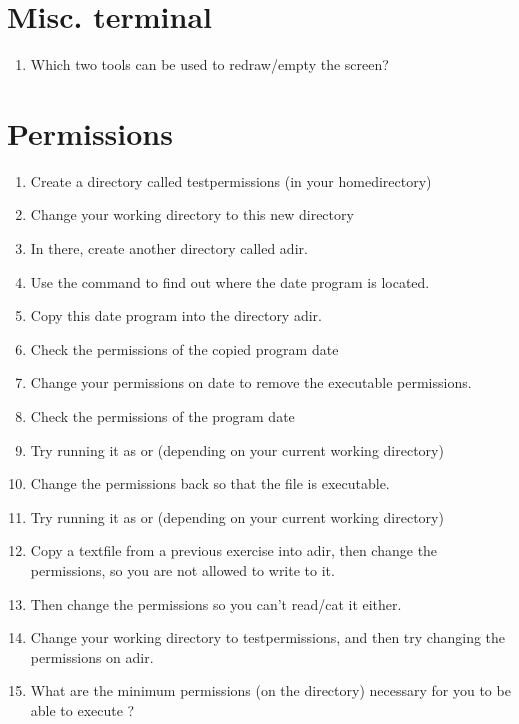 \documentclass[a4paper,11pt,english]{sphinxmanual}
\begin{document}
\section{Misc. terminal}
\label{exercises/exercises_beginner:misc-terminal}\begin{enumerate}
\item {} 
Which two tools can be used to redraw/empty the screen?

\end{enumerate}


\section{Permissions}
\label{exercises/exercises_beginner:permissions}\begin{enumerate}
\item {} 
Create a directory called testpermissions (in your homedirectory)

\item {} 
Change your working directory to this new directory

\item {} 
In there, create another directory called adir.

\item {} 
Use the command  to find out where the date program is located.

\item {} 
Copy this date program into the directory adir.

\item {} 
Check the permissions of the copied program date

\item {} 
Change your permissions on date to remove the executable permissions.

\item {} 
Check the permissions of the program date

\item {} 
Try running it as  or  (depending on your current working directory)

\item {} 
Change the permissions back so that the file is executable.

\item {} 
Try running it as  or  (depending on your current working directory)

\item {} 
Copy a textfile from a previous exercise into adir, then change the permissions, so you are not allowed to write to it.

\item {} 
Then change the permissions so you can't read/cat it either.

\item {} 
Change your working directory to testpermissions, and then try changing the permissions on adir.

\item {} 
What are the minimum permissions (on the directory) necessary for you to be able to execute ?

\end{enumerate}
\end{document}
